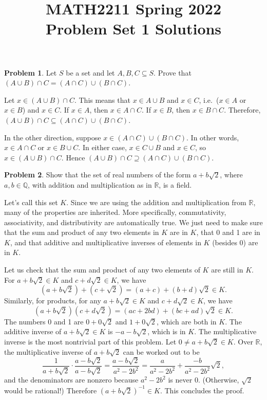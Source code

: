 \documentclass[11pt,oneside]{amsart}
\title{MATH2211 Spring 2022\\
Problem Set 1 Solutions}
\theoremstyle{definition}
\newtheorem{problem}{Problem}
\newcommand{\bQ}{\mathbb{Q}}
\newcommand{\bR}{\mathbb{R}}
\begin{document}
    \maketitle

    \begin{problem}
        Let $S$ be a set and let $A,B,C\subseteq S$. Prove that $(A\cup B)\cap C=(A\cap C)\cup(B\cap C)$.
    \end{problem}
    \begin{solution}
        Let $x\in (A\cup B)\cap C$. This means that $x\in A\cup B$ and $x\in C$, i.e.\ ($x\in A$ or $x\in B$) and $x\in C$. If $x\in A$, then $x\in A\cap C$. If $x\in B$, then $x\in B\cap C$. Therefore, $(A\cup B)\cap C\subseteq (A\cap C)\cup (B\cap C)$.

        In the other direction, suppose $x\in (A\cap C)\cup (B\cap C)$. In other words, $x\in A\cap C$ or $x\in B\cup C$. In either case, $x\in C\cup B$ and $x\in C$, so $x\in (A\cup B)\cap C$. Hence $(A\cup B)\cap C\supseteq (A\cap C)\cup(B\cap C)$.
    \end{solution}

    \begin{problem}
        Show that the set of real numbers of the form $a+b\sqrt2$, where $a,b\in\bQ$, with addition and multiplication as in $\bR$, is a field.
    \end{problem}
    \begin{solution}
        Let's call this set $K$. Since we are using the addition and multiplication from $\bR$, many of the properties are inherited. More specifically, commutativity, associativity, and distributivity are automatically true. We just need to make sure that the sum and product of any two elements in $K$ are in $K$, that 0 and 1 are in $K$, and that additive and multiplicative inverses of elements in $K$ (besides 0) are in $K$.
        
        Let us check that the sum and product of any two elements of $K$ are still in $K$. For $a+b\sqrt2\in K$ and $c+d\sqrt2\in K$, we have
        \[(a+b\sqrt2)+(c+\sqrt2)=(a+c)+(b+d)\sqrt2\in K.\]
        Similarly, for products, for any $a+b\sqrt2\in K$ and $c+d\sqrt2\in K$, we have
        \[(a+b\sqrt2)(c+d\sqrt2)=(ac+2bd)+(bc+ad)\sqrt2\in K.\]
        The numbers 0 and 1 are $0+0\sqrt2$ and $1+0\sqrt2$, which are both in $K$. The additive inverse of $a+b\sqrt2\in K$ is $-a-b\sqrt2$, which is in $K$. The multiplicative inverse is the most nontrivial part of this problem. Let $0\neq a+b\sqrt2\in K$. Over $\bR$, the multiplicative inverse of $a+b\sqrt2$ can be worked out to be
        \[\frac 1{a+b\sqrt2}\cdot\frac{a-b\sqrt2}{a-b\sqrt2}=\frac{a-b\sqrt2}{a^2-2b^2}=\frac a{a^2-2b^2}+\frac{-b}{a^2-2b^2}\sqrt2,\]
        and the denominators are nonzero because $a^2-2b^2$ is never 0. (Otherwise, $\sqrt2$ would be rational!) Therefore $(a+b\sqrt2)^{-1}\in K$. This concludes the proof.
    \end{solution}
\end{document}

